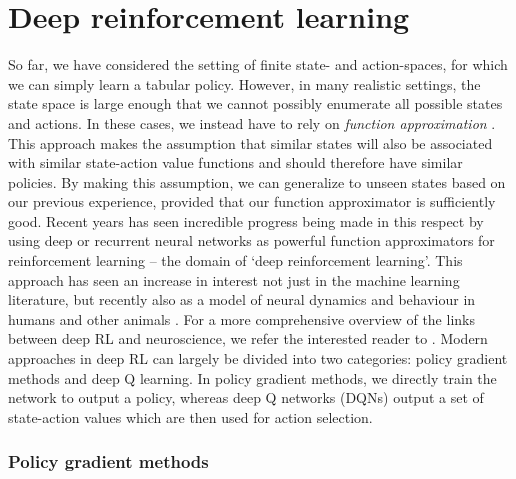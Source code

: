 \section{Deep reinforcement learning}
\label{sec:deep_RL}

So far, we have considered the setting of finite state- and action-spaces, for which we can simply learn a tabular policy.
However, in many realistic settings, the state space is large enough that we cannot possibly enumerate all possible states and actions.
In these cases, we instead have to rely on \emph{function approximation} \citep{sutton2018reinforcement}.
This approach makes the assumption that similar states will also be associated with similar state-action value functions and should therefore have similar policies.
By making this assumption, we can generalize to unseen states based on our previous experience, provided that our function approximator is sufficiently good.
Recent years has seen incredible progress being made in this respect by using deep or recurrent neural networks as powerful function approximators for reinforcement learning -- the domain of `deep reinforcement learning'.
This approach has seen an increase in interest not just in the machine learning literature, but recently also as a model of neural dynamics and behaviour in humans and other animals \citep{wang2018prefrontal, jensen2023recurrent, makino2023arithmetic, merel2019deep, banino2018vector}.
For a more comprehensive overview of the links between deep RL and neuroscience, we refer the interested reader to \citep{botvinick2020deep}.
Modern approaches in deep RL can largely be divided into two categories: policy gradient methods and deep Q learning.
In policy gradient methods, we directly train the network to output a policy, whereas deep Q networks (DQNs) output a set of state-action values which are then used for action selection.

\subsubsection*{Policy gradient methods}

